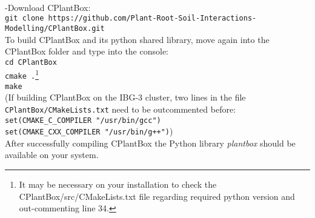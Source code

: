 \lstinline{}\\

-Download CPlantBox:\\
\texttt{git clone https://github.com/Plant-Root-Soil-Interactions-Modelling/CPlantBox.git}\\

To build CPlantBox and its python shared library, move again into the CPlantBox folder and type into the console:\\
\lstinline {cd CPlantBox}\\
\lstinline{cmake .}\footnote{It may be necessary on your installation to check the CPlantBox/src/CMakeLists.txt file regarding required python version and out-commenting line 34.}\\
\lstinline{make}\\
(If building CPlantBox on the IBG-3 cluster, two lines in the file \lstinline{CPlantBox/CMakeLists.txt} need to be outcommented before:\\ 
\lstinline{set(CMAKE_C_COMPILER "/usr/bin/gcc")}\\
\lstinline{set(CMAKE_CXX_COMPILER "/usr/bin/g++")})\\

After successfully compiling CPlantBox the Python library \emph{plantbox} should be available on your system. 
